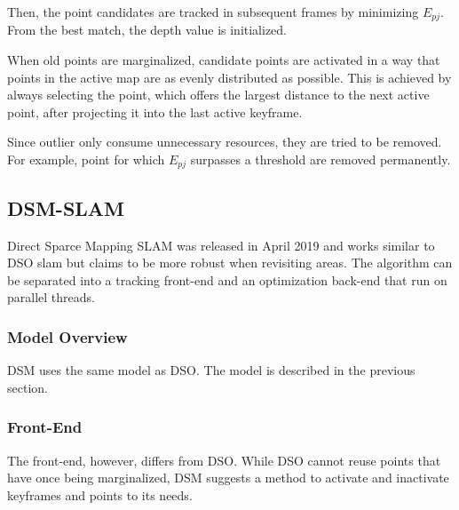 \begin{enumerate}
	Then, the point candidates are tracked in subsequent frames by minimizing $E_{pj}$. From the best match, the depth value is initialized. 
	
	When old points are marginalized, candidate points are activated in a way that points in the active map are as evenly distributed 
	as possible. This is achieved by always selecting the point, which offers the largest distance to the next active point, after projecting
	it into the last active keyframe. 
	
	Since outlier only consume unnecessary resources, they are tried to be removed. For example, point for which $E_{pj}$ surpasses a threshold 
	are removed permanently. 
	
	\end{enumerate}

	\subsection{DSM-SLAM}
	
	Direct Sparce Mapping SLAM was released in April 2019 and works similar to DSO slam but claims to be more robust when revisiting 
	areas. The algorithm can be separated into a tracking 
	front-end and an optimization back-end that run on parallel threads. 
	
	\subsubsection{Model Overview}
	
		DSM uses the same model as DSO. The model is described in the previous section.
	
	\subsubsection{Front-End}
	
	The front-end, however, differs from DSO. While DSO cannot reuse points that have once being marginalized, DSM suggests a method 
	to activate and inactivate keyframes and points to its needs. 
	
